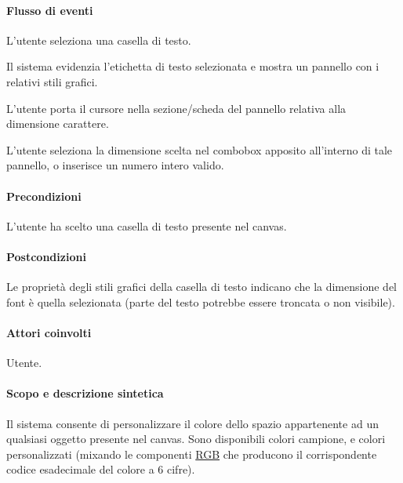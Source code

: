 \paragraph{Flusso di eventi}
\begin{elenconumerato}[\textbf{}]{\subsubsecindent}
\item L'utente seleziona una casella di testo.
\item Il sistema evidenzia l'etichetta di testo selezionata e mostra un pannello con i relativi stili grafici.
\item L'utente porta il cursore nella sezione/scheda del pannello relativa alla dimensione carattere.
\item L'utente seleziona la dimensione scelta nel combobox apposito all'interno di tale pannello, o inserisce un numero intero valido.
\end{elenconumerato}
\paragraph{Precondizioni}L'utente ha scelto una casella di testo presente nel canvas.
\paragraph{Postcondizioni}Le propriet\`a degli stili grafici della casella di testo indicano che la dimensione del font \` e quella selezionata (parte del testo potrebbe essere troncata o non visibile).

\paragraph{Attori coinvolti} Utente.
\paragraph{Scopo e descrizione sintetica}   Il sistema consente di personalizzare il colore dello spazio appartenente ad un qualsiasi oggetto presente nel canvas. Sono disponibili colori campione, e colori personalizzati (mixando le componenti \underline{RGB} che producono il corrispondente codice esadecimale del colore a 6 cifre).
